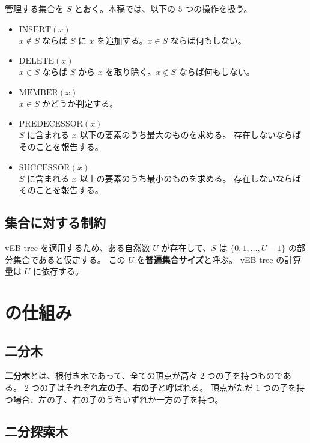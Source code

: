 \documentclass[dvipdfmx,a4j,10pt]{jarticle}
\begin{document}
管理する集合を $S$ とおく。本稿では、以下の $5$ つの操作を扱う。

\begin{itemize}
  \item $\mathrm{INSERT}(x)$ \mbox{}\\
    $x \notin S$ ならば $S$ に $x$ を追加する。$x \in S$ ならば何もしない。
  \item $\mathrm{DELETE}(x)$ \mbox{}\\
    $x \in S$ ならば $S$ から $x$ を取り除く。$x \notin S$ ならば何もしない。
  \item $\mathrm{MEMBER}(x)$ \mbox{}\\
    $x \in S$ かどうか判定する。
  \item $\mathrm{PREDECESSOR}(x)$ \mbox{}\\
    $S$ に含まれる $x$ 以下の要素のうち最大のものを求める。
    存在しないならばそのことを報告する。
  \item $\mathrm{SUCCESSOR}(x)$ \mbox{}\\
    $S$ に含まれる $x$ 以上の要素のうち最小のものを求める。
    存在しないならばそのことを報告する。
\end{itemize}

\subsection{集合に対する制約}

vEB tree を適用するため、ある自然数 $U$ が存在して、$S$ は $\{0, 1, \dots, U-1\}$ の部分集合であると仮定する。
この $U$ を\textbf{普遍集合サイズ}と呼ぶ。
vEB tree の計算量は $U$ に依存する。

\section{ の仕組み}

\subsection{二分木}

\textbf{二分木}とは、根付き木であって、全ての頂点が高々 $2$ つの子を持つものである。
$2$ つの子はそれぞれ\textbf{左の子}、\textbf{右の子}と呼ばれる。
頂点がただ $1$ つの子を持つ場合、左の子、右の子のうちいずれか一方の子を持つ。

\subsection{二分探索木}
\end{document}
